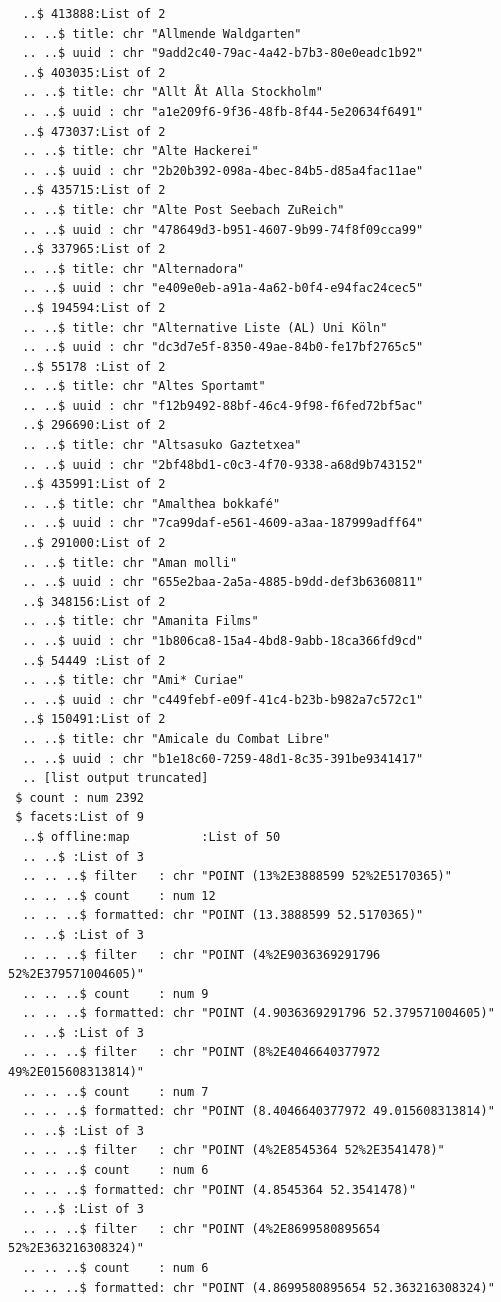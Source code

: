 \documentclass[
  letterpaper,
  DIV=11,
  numbers=noendperiod]{scrartcl}
\begin{document}
\begin{verbatim}
  ..$ 413888:List of 2
  .. ..$ title: chr "Allmende Waldgarten"
  .. ..$ uuid : chr "9add2c40-79ac-4a42-b7b3-80e0eadc1b92"
  ..$ 403035:List of 2
  .. ..$ title: chr "Allt Åt Alla Stockholm"
  .. ..$ uuid : chr "a1e209f6-9f36-48fb-8f44-5e20634f6491"
  ..$ 473037:List of 2
  .. ..$ title: chr "Alte Hackerei"
  .. ..$ uuid : chr "2b20b392-098a-4bec-84b5-d85a4fac11ae"
  ..$ 435715:List of 2
  .. ..$ title: chr "Alte Post Seebach ZuReich"
  .. ..$ uuid : chr "478649d3-b951-4607-9b99-74f8f09cca99"
  ..$ 337965:List of 2
  .. ..$ title: chr "Alternadora"
  .. ..$ uuid : chr "e409e0eb-a91a-4a62-b0f4-e94fac24cec5"
  ..$ 194594:List of 2
  .. ..$ title: chr "Alternative Liste (AL) Uni Köln"
  .. ..$ uuid : chr "dc3d7e5f-8350-49ae-84b0-fe17bf2765c5"
  ..$ 55178 :List of 2
  .. ..$ title: chr "Altes Sportamt"
  .. ..$ uuid : chr "f12b9492-88bf-46c4-9f98-f6fed72bf5ac"
  ..$ 296690:List of 2
  .. ..$ title: chr "Altsasuko Gaztetxea"
  .. ..$ uuid : chr "2bf48bd1-c0c3-4f70-9338-a68d9b743152"
  ..$ 435991:List of 2
  .. ..$ title: chr "Amalthea bokkafé"
  .. ..$ uuid : chr "7ca99daf-e561-4609-a3aa-187999adff64"
  ..$ 291000:List of 2
  .. ..$ title: chr "Aman molli"
  .. ..$ uuid : chr "655e2baa-2a5a-4885-b9dd-def3b6360811"
  ..$ 348156:List of 2
  .. ..$ title: chr "Amanita Films"
  .. ..$ uuid : chr "1b806ca8-15a4-4bd8-9abb-18ca366fd9cd"
  ..$ 54449 :List of 2
  .. ..$ title: chr "Ami* Curiae"
  .. ..$ uuid : chr "c449febf-e09f-41c4-b23b-b982a7c572c1"
  ..$ 150491:List of 2
  .. ..$ title: chr "Amicale du Combat Libre"
  .. ..$ uuid : chr "b1e18c60-7259-48d1-8c35-391be9341417"
  .. [list output truncated]
 $ count : num 2392
 $ facets:List of 9
  ..$ offline:map          :List of 50
  .. ..$ :List of 3
  .. .. ..$ filter   : chr "POINT (13%2E3888599 52%2E5170365)"
  .. .. ..$ count    : num 12
  .. .. ..$ formatted: chr "POINT (13.3888599 52.5170365)"
  .. ..$ :List of 3
  .. .. ..$ filter   : chr "POINT (4%2E9036369291796 52%2E379571004605)"
  .. .. ..$ count    : num 9
  .. .. ..$ formatted: chr "POINT (4.9036369291796 52.379571004605)"
  .. ..$ :List of 3
  .. .. ..$ filter   : chr "POINT (8%2E4046640377972 49%2E015608313814)"
  .. .. ..$ count    : num 7
  .. .. ..$ formatted: chr "POINT (8.4046640377972 49.015608313814)"
  .. ..$ :List of 3
  .. .. ..$ filter   : chr "POINT (4%2E8545364 52%2E3541478)"
  .. .. ..$ count    : num 6
  .. .. ..$ formatted: chr "POINT (4.8545364 52.3541478)"
  .. ..$ :List of 3
  .. .. ..$ filter   : chr "POINT (4%2E8699580895654 52%2E363216308324)"
  .. .. ..$ count    : num 6
  .. .. ..$ formatted: chr "POINT (4.8699580895654 52.363216308324)"

\end{verbatim}
\end{document}

